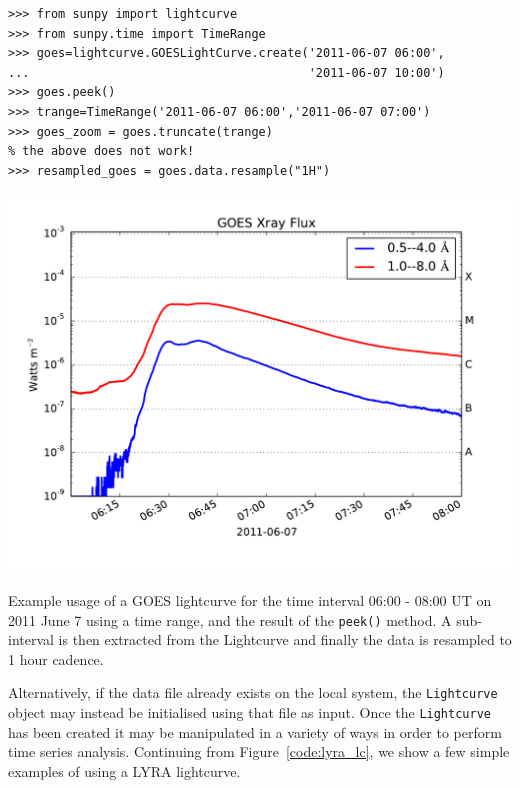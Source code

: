 \begin{Figure}[H]
\begin{verbatim}
>>> from sunpy import lightcurve
>>> from sunpy.time import TimeRange
>>> goes=lightcurve.GOESLightCurve.create('2011-06-07 06:00',
...                                       '2011-06-07 10:00')
>>> goes.peek()
>>> trange=TimeRange('2011-06-07 06:00','2011-06-07 07:00')
>>> goes_zoom = goes.truncate(trange)
% the above does not work!
>>> resampled_goes = goes.data.resample("1H")
\end{verbatim}
\includegraphics[width=14cm]{goes_lightcurve.pdf}
\caption{Example usage of a GOES lightcurve for the time interval 06:00 - 08:00 UT on 
2011 June 7 using a time range, and the result of the \texttt{peek()} method.
A sub-interval is then extracted from the Lightcurve and finally the data is resampled
to 1 hour cadence.}
\label{code:goes_lc}
\end{Figure}

Alternatively, if the data file already exists on the local system, the 
\texttt{Lightcurve} object may instead be initialised using that file as input.
Once the \texttt{Lightcurve} has been created it may be manipulated in 
a variety of ways in order to perform time series analysis. 
Continuing from Figure~\ref{code:lyra_lc}, we show a few simple 
examples of using a LYRA lightcurve.